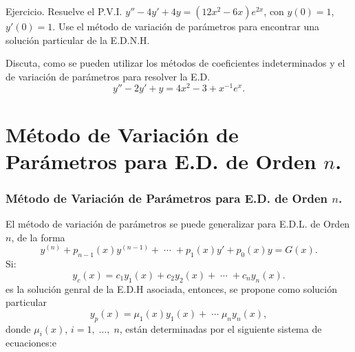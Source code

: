 \documentclass{beamer}
\begin{document}
\begin{frame}[t]
	\begin{alertblock}{Ejercicio.}
		Resuelve el P.V.I. \(y'' -4y' +4y=(12x^2-6x) e^{2x}\), con \(y(0) =1\), \(y' (0) =1\). Use el método de variación de parámetros para encontrar una solución particular de la E.D.N.H.
	\end{alertblock}
\end{frame}
\begin{frame}[t]
\end{frame}

\begin{frame}[t]
	\begin{example}
		Discuta, como se pueden utilizar los métodos de coeficientes indeterminados y el de variación de parámetros para resolver la E.D.
		\[
			y'' -2y' +y = 4x^2-3+x^{-1} e^x.
		\]
	\end{example}
\end{frame}

\section{Método de Variación de Parámetros para E.D. de Orden \(n\).} %
\begin{frame}[t]
	\begin{block}{}
		\frametitle{Método de Variación de Parámetros para E.D. de Orden \(n\).}
		El método de variación de parámetros se puede generalizar para E.D.L. de Orden \(n\), de la forma
		\[
			y^{(n)} + p_{n-1} (x) y^{(n-1)} + \;\cdots\; +p_1(x) y' + p_0(x) y = G(x).
		\]
		Si:
		\[
			y_c(x) = c_1y_1(x) + c_2y_2(x) + \;\cdots\; + c_ny_n(x).
		\]
		es la solución genral de la E.D.H asociada, entonces, se propone como solución particular
		\[
			y_p(x) = \mu _1(x) y_1(x) + \;\cdots\; \mu _ny_n(x),
		\]
		donde \(\mu _i(x)\), \(i=1, \;\ldots,\; n\), están determinadas por el siguiente sistema de ecuaciones:e
	\end{block}
\end{frame}
\end{document}
